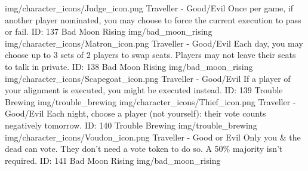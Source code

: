 	{img/character_icons/Judge_icon.png}
	{\color{goodcolor}Traveller \color{evilcolor}- Good/Evil}
	{Once per game, if another player nominated, you may choose to force the current execution to pass or fail.}        
	{ID: 137}
	{Bad Moon Rising}
	{img/bad_moon_rising}
	{img/character_icons/Matron_icon.png}
	{\color{goodcolor}Traveller \color{evilcolor}- Good/Evil}
	{Each day, you may choose up to 3 sets of 2 players to swap seats. Players may not leave their seats to talk in private.}        
	{ID: 138}
	{Bad Moon Rising}
	{img/bad_moon_rising}
	{img/character_icons/Scapegoat_icon.png}
	{\color{goodcolor}Traveller \color{evilcolor}- Good/Evil}
	{If a player of your alignment is executed, you might be executed instead.}        
	{ID: 139}
	{Trouble Brewing}
	{img/trouble_brewing}
	{img/character_icons/Thief_icon.png}
	{\color{goodcolor}Traveller \color{evilcolor}- Good/Evil}
	{Each night, choose a player (not yourself): their vote counts negatively tomorrow.}        
	{ID: 140}
	{Trouble Brewing}
	{img/trouble_brewing}
	{img/character_icons/Voudon_icon.png}
	{\color{goodcolor}Traveller \color{evilcolor}- Good or Evil}
	{Only you \& the dead can vote. They don't need a vote token to do so. A 50\% majority isn't required.}        
	{ID: 141}
	{Bad Moon Rising}
	{img/bad_moon_rising}
